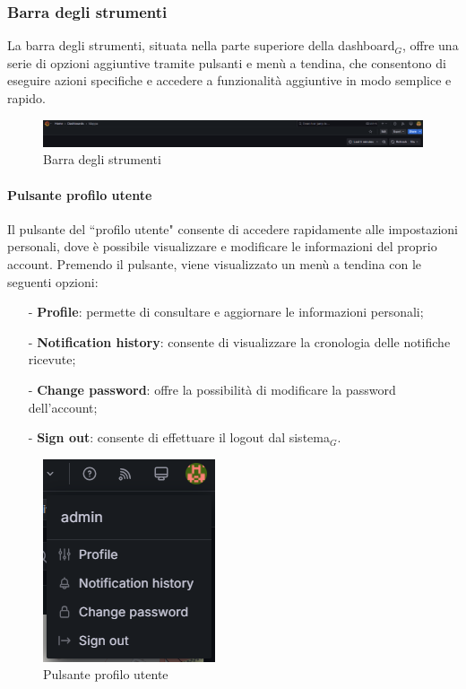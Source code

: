 \documentclass[10pt]{article}
\begin{document}
\begin{justify}
    \subsubsection{Barra degli strumenti} %
    La barra degli strumenti, situata nella parte superiore della dashboard$_G$, offre una serie di opzioni aggiuntive tramite pulsanti e menù a tendina, che consentono di eseguire azioni specifiche e accedere a funzionalità aggiuntive in modo semplice e rapido.\\
    \begin{figure}[H]
    \centering
    \includegraphics[width=1\linewidth]{barra.png}
    \caption{Barra degli strumenti}
    \end{figure}

    \paragraph{Pulsante profilo utente}
    Il pulsante del ``profilo utente" consente di accedere rapidamente alle impostazioni personali, dove è possibile visualizzare e modificare le informazioni del proprio account. Premendo il pulsante, viene visualizzato un menù a tendina con le seguenti opzioni:
    \begin{itemize}
        \item[-] \textbf{Profile}: permette di consultare e aggiornare le informazioni personali;
        \item[-] \textbf{Notification history}: consente di visualizzare la cronologia delle notifiche ricevute;
        \item[-] \textbf{Change password}: offre la possibilità di modificare la password dell'account;
        \item[-] \textbf{Sign out}: consente di effettuare il logout dal sistema$_G$.
    \end{itemize}
    \begin{figure}[H]
    \centering
    \includegraphics[width=0.25\linewidth]{profilo.png}
    \caption{Pulsante profilo utente}
    \end{figure}


\end{justify}
\end{document}

